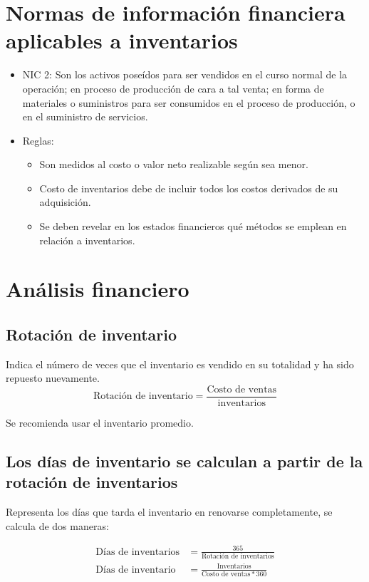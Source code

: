 \documentclass{article}
\begin{document}
\section{Normas de información financiera aplicables a inventarios}
\begin{itemize}
    \item NIC 2: Son los activos poseídos para ser vendidos en el curso normal de la operación; en proceso de producción de cara a tal venta; en forma de materiales o suministros para ser consumidos en el proceso de producción, o en el suministro de servicios.
    \item Reglas:
    \begin{itemize}
        \item Son medidos al costo o valor neto realizable según sea menor.
        \item Costo de inventarios debe de incluir todos los costos derivados de su adquisición.
        \item Se deben revelar en los estados financieros qué métodos se emplean en relación a inventarios.
    \end{itemize}
\end{itemize}



\section{Análisis financiero}

\subsection{Rotación de inventario}
Indica el número de veces que el inventario es vendido en su totalidad y ha sido repuesto nuevamente.
\[
  \text{Rotación de inventario} = \frac{\text{Costo de ventas}}{\text{inventarios}}
\]

Se recomienda usar el inventario promedio.

\subsection{Los días de inventario se calculan a partir de la rotación de inventarios}
Representa los días que tarda el inventario en renovarse completamente, se calcula de dos maneras:

\begin{align*}
    \text{Días de inventarios} & = \frac{365}{\text{Rotación de inventarios}}\\ 
    \text{Días de inventario} & = \frac{\text{Inventarios}}{\text{Costo de ventas} * 360} \\ 
\end{align*}
\end{document}
